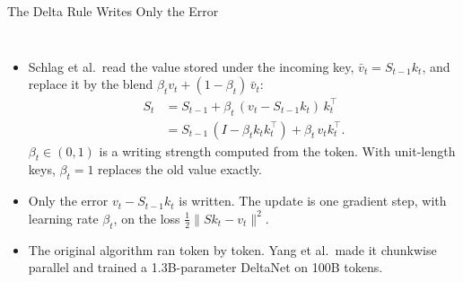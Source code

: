 \begin{frame}{The Delta Rule Writes Only the Error}
  \begin{columns}[T,onlytextwidth]
      \begin{itemize}\footnotesize\itemsep0.3em
        \item[\textcolor{red}{$\blacktriangleright$}] Schlag et al.\ read the value stored under the incoming key, $\bar v_t = S_{t-1} k_t$, and replace it by the blend $\beta_t v_t + (1-\beta_t)\,\bar v_t$:
          \begin{align*}
            S_t &= S_{t-1} + \beta_t\,(v_t - S_{t-1}k_t)\,k_t^\top\\
                &= S_{t-1}\,(I - \beta_t k_t k_t^\top) + \beta_t\, v_t k_t^\top.
          \end{align*}
          $\beta_t \in (0,1)$ is a writing strength computed from the token. With unit-length keys, $\beta_t = 1$ replaces the old value exactly.
        \item[\textcolor{red}{$\blacktriangleright$}] Only the error $v_t - S_{t-1}k_t$ is written. The update is one gradient step, with learning rate $\beta_t$, on the loss $\tfrac{1}{2}\lVert S k_t - v_t\rVert^2$.
        \item[\textcolor{red}{$\blacktriangleright$}] The original algorithm ran token by token. Yang et al.\ made it chunkwise parallel and trained a 1.3B-parameter DeltaNet on 100B tokens.
      \end{itemize}
      \centering
      \vspace{0.4em}
\end{columns}
\end{frame}
